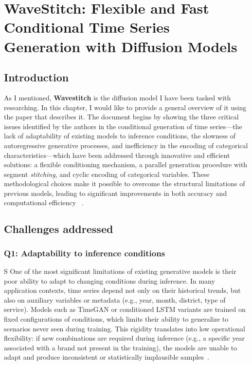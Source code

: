\chapter{WaveStitch: Flexible and Fast Conditional Time Series Generation with Diffusion Models}

\section{Introduction}
As I mentioned, \textbf{Wavestitch} is the diffusion model I have been tasked with researching.  
In this chapter, I would like to provide a general overview of it using the paper that describes it.  
The document begins by showing the three critical issues identified by the authors in the conditional generation of time series—the lack of adaptability of existing models to inference conditions, the slowness of autoregressive generative processes, and inefficiency in the encoding of categorical characteristics—which have been addressed through innovative and efficient solutions: a flexible conditioning mechanism, a parallel generation procedure with segment \emph{stitching}, and cyclic encoding of categorical variables.  
These methodological choices make it possible to overcome the structural limitations of previous models, leading to significant improvements in both accuracy and computational efficiency~\cite{wavestitch} .

\section{Challenges addressed}

\subsection{Q1: Adaptability to inference conditions}S
One of the most significant limitations of existing generative models is their poor ability to adapt to changing conditions during inference.  
In many application contexts, time series depend not only on their historical trends, but also on auxiliary variables or metadata (e.g., year, month, district, type of service).  
Models such as TimeGAN or conditioned LSTM variants are trained on fixed configurations of conditions, which limits their ability to generalize to scenarios never seen during training.  
This rigidity translates into low operational flexibility: if new combinations are required during inference (e.g., a specific year associated with a brand not present in the training), the models are unable to adapt and produce inconsistent or statistically implausible samples~\cite{yoon2019timegan}.

